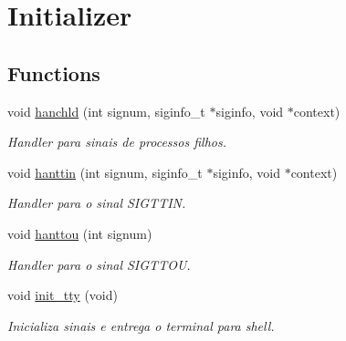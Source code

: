 \hypertarget{group__Initializer}{
\section{Initializer}
\label{group__Initializer}
}
\subsection*{Functions}
\begin{DoxyCompactItemize}
\item 
\hypertarget{group__Initializer_ga427b8391fe7c3a1407d5fc04dcd6a62e}{
void \hyperlink{group__Initializer_ga427b8391fe7c3a1407d5fc04dcd6a62e}{hanchld} (int signum, siginfo\_\-t $\ast$siginfo, void $\ast$context)}
\label{group__Initializer_ga427b8391fe7c3a1407d5fc04dcd6a62e}

\begin{DoxyCompactList}\small\item\em Handler para sinais de processos filhos. \end{DoxyCompactList}\item 
\hypertarget{group__Initializer_ga2e0e24610063a598497c1cec18556a6e}{
void \hyperlink{group__Initializer_ga2e0e24610063a598497c1cec18556a6e}{hanttin} (int signum, siginfo\_\-t $\ast$siginfo, void $\ast$context)}
\label{group__Initializer_ga2e0e24610063a598497c1cec18556a6e}

\begin{DoxyCompactList}\small\item\em Handler para o sinal SIGTTIN. \end{DoxyCompactList}\item 
\hypertarget{group__Initializer_ga9e6fdc72e9bcee53fec2361be71d9599}{
void \hyperlink{group__Initializer_ga9e6fdc72e9bcee53fec2361be71d9599}{hanttou} (int signum)}
\label{group__Initializer_ga9e6fdc72e9bcee53fec2361be71d9599}

\begin{DoxyCompactList}\small\item\em Handler para o sinal SIGTTOU. \end{DoxyCompactList}\item 
\hypertarget{group__Initializer_gac63bd0fae717f105be185ccfd755ca16}{
void \hyperlink{group__Initializer_gac63bd0fae717f105be185ccfd755ca16}{init\_\-tty} (void)}
\label{group__Initializer_gac63bd0fae717f105be185ccfd755ca16}

\begin{DoxyCompactList}\small\item\em Inicializa sinais e entrega o terminal para shell. \end{DoxyCompactList}\end{DoxyCompactItemize}

